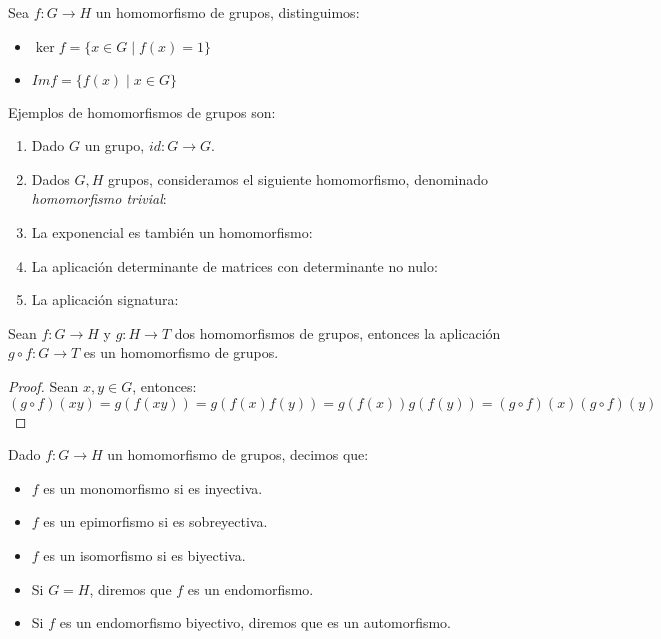 \begin{definicion}
Sea $f:G\to H$ un homomorfismo de grupos, distinguimos:
\begin{itemize}
    \item $\ker f = \{x\in G \mid f(x) = 1\}$
    \item $Im f = \{f(x) \mid x\in G\}$
\end{itemize}
\end{definicion}

\begin{ejemplo}
    Ejemplos de homomorfismos de grupos son:
    \begin{enumerate}
        \item Dado $G$ un grupo, $id:G\to G$.
        \item Dados $G,H$ grupos, consideramos el siguiente homomorfismo, denominado \emph{homomorfismo trivial}:
        \item La exponencial es también un homomorfismo:
        
        \item La aplicación determinante de matrices con determinante no nulo:
        \item La aplicación signatura:
    \end{enumerate}
\end{ejemplo}

\begin{prop}\label{prop:comp_homomorf}
    Sean $f:G\to H$ y $g:H\to T$ dos homomorfismos de grupos, entonces la aplicación $g\circ f:G\to T$ es un homomorfismo de grupos.
    \begin{proof}
        Sean $x,y\in G$, entonces:
        \begin{equation*}
            (g\circ f)(xy) = g(f(xy)) = g(f(x)f(y)) = g(f(x)) g(f(y)) = (g\circ f)(x)(g\circ f)(y)
        \end{equation*}
    \end{proof}
\end{prop}

\begin{definicion}
    Dado $f:G\to H$ un homomorfismo de grupos, decimos que:
    \begin{itemize}
        \item $f$ es un monomorfismo si es inyectiva.
        \item $f$ es un epimorfismo si es sobreyectiva.
        \item $f$ es un isomorfismo si es biyectiva.
        \item Si $G=H$, diremos que $f$ es un endomorfismo.
        \item Si $f$ es un endomorfismo biyectivo, diremos que es un automorfismo.
    \end{itemize}
\end{definicion}

